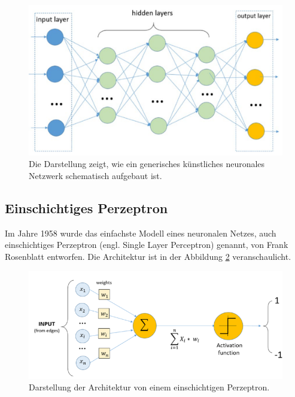 \begin{figure}[h!]
	\centering
	\includegraphics[width=\textwidth]{bilder/network_aufbau.PNG}
	\caption{Die Darstellung zeigt, wie ein generisches künstliches neuronales Netzwerk schematisch aufgebaut ist\cite{Nelli2018}.}
	\label{network_aufbau}
\end{figure}


\subsection{Einschichtiges Perzeptron}

Im Jahre 1958 wurde das einfachste Modell eines neuronalen Netzes\cite{Nelli2018}, auch einschichtiges Perzeptron (engl. Single Layer Perceptron) genannt, von Frank Rosenblatt entworfen. Die Architektur ist in der Abbildung \ref{single_perz} veranschaulicht. 

\begin{figure}[h!]
	\centering
	\includegraphics[width=\textwidth]{bilder/single_perz.PNG}
	\caption{Darstellung der Architektur von einem einschichtigen Perzeptron\cite{Nelli2018}.}
	\label{single_perz}
\end{figure}

